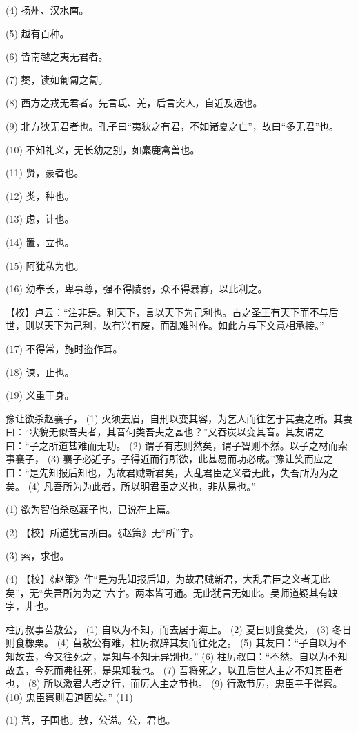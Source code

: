 \documentclass[12pt,UTF8]{ctexbook}
\begin{document}
(4) 扬州、汉水南。

(5) 越有百种。

(6) 皆南越之夷无君者。

(7) 僰，读如匍匐之匐。

(8) 西方之戎无君者。先言氐、羌，后言突人，自近及远也。

(9) 北方狄无君者也。孔子曰“夷狄之有君，不如诸夏之亡”，故曰“多无君”也。

(10) 不知礼义，无长幼之别，如麋鹿禽兽也。

(11) 贤，豪者也。

(12) 类，种也。

(13) 虑，计也。

(14) 置，立也。

(15) 阿犹私为也。

(16) 幼奉长，卑事尊，强不得陵弱，众不得暴寡，以此利之。

【校】卢云：“注非是。利天下，言以天下为己利也。古之圣王有天下而不与后世，则以天下为己利，故有兴有废，而乱难时作。如此方与下文意相承接。”

(17) 不得常，施时盗作耳。

(18) 谏，止也。

(19) 义重于身。

豫让欲杀赵襄子， (1) 灭须去眉，自刑以变其容，为乞人而往乞于其妻之所。其妻曰：“状貌无似吾夫者，其音何类吾夫之甚也？”又吞炭以变其音。其友谓之曰：“子之所道甚难而无功。 (2) 谓子有志则然矣，谓子智则不然。以子之材而索事襄子， (3) 襄子必近子。子得近而行所欲，此甚易而功必成。”豫让笑而应之曰：“是先知报后知也，为故君贼新君矣，大乱君臣之义者无此，失吾所为为之矣。 (4) 凡吾所为为此者，所以明君臣之义也，非从易也。”

(1) 欲为智伯杀赵襄子也，已说在上篇。

(2) 【校】所道犹言所由。《赵策》无“所”字。

(3) 索，求也。

(4) 【校】《赵策》作“是为先知报后知，为故君贼新君，大乱君臣之义者无此矣”，无“失吾所为为之”六字。两本皆可通。无此犹言无如此。吴师道疑其有缺字，非也。

柱厉叔事莒敖公， (1) 自以为不知，而去居于海上。 (2) 夏日则食菱芡， (3) 冬日则食橡栗。 (4) 莒敖公有难，柱厉叔辞其友而往死之。 (5) 其友曰：“子自以为不知故去，今又往死之，是知与不知无异别也。” (6) 柱厉叔曰：“不然。自以为不知故去，今死而弗往死，是果知我也。 (7) 吾将死之，以丑后世人主之不知其臣者也， (8) 所以激君人者之行，而厉人主之节也。 (9) 行激节厉，忠臣幸于得察。 (10) 忠臣察则君道固矣。” (11)

(1) 莒，子国也。敖，公谥。公，君也。
\end{document}

